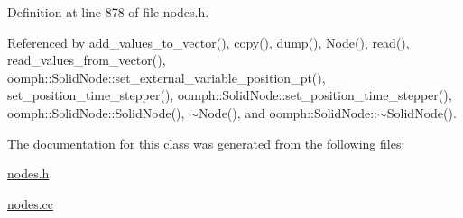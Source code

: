 Definition at line 878 of file nodes.\+h.



Referenced by add\+\_\+values\+\_\+to\+\_\+vector(), copy(), dump(), Node(), read(), read\+\_\+values\+\_\+from\+\_\+vector(), oomph\+::\+Solid\+Node\+::set\+\_\+external\+\_\+variable\+\_\+position\+\_\+pt(), set\+\_\+position\+\_\+time\+\_\+stepper(), oomph\+::\+Solid\+Node\+::set\+\_\+position\+\_\+time\+\_\+stepper(), oomph\+::\+Solid\+Node\+::\+Solid\+Node(), $\sim$\+Node(), and oomph\+::\+Solid\+Node\+::$\sim$\+Solid\+Node().



The documentation for this class was generated from the following files\+:\begin{DoxyCompactItemize}
\item 
\hyperlink{nodes_8h}{nodes.\+h}\item 
\hyperlink{nodes_8cc}{nodes.\+cc}\end{DoxyCompactItemize}
